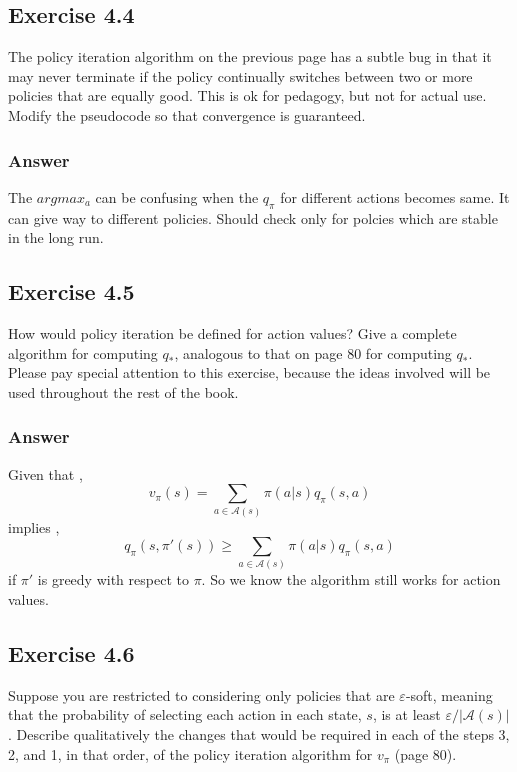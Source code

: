 \begin{Document}
\subsection{Exercise 4.4}
The policy iteration algorithm on the previous page has a subtle bug in that it may never terminate if the policy continually switches between two or more policies that are equally good. This is ok for pedagogy, but not for actual use. Modify the pseudocode so that convergence is guaranteed.

\subsubsection{Answer}
The $argmax_a$ can be confusing when the $q_\pi$ for different actions becomes same. It can give way to different policies. Should check only for polcies which are stable in the long run.

\subsection{Exercise 4.5}
How would policy iteration be defined for action values? Give a complete algorithm for computing $q_*$, analogous to that on page 80 for computing $q_*$. Please pay special attention to this exercise, because the ideas involved will be used throughout the rest of the book.

\subsubsection{Answer}
Given that ,
\begin{equation}
    v_\pi(s) = \sum_{a \in \mathcal{A}(s)} \pi(a|s)q_\pi(s, a)
\end{equation}
implies ,
\begin{equation}
    q_\pi(s, \pi'(s)) \geq \sum_{a \in \mathcal{A}(s)} \pi(a|s)q_\pi(s, a)
\end{equation}
if $\pi'$ is greedy with respect to $\pi$. So we know the algorithm still works for action values.

\subsection{Exercise 4.6}
Suppose you are restricted to considering only policies that are $\varepsilon$-soft, meaning that the probability of selecting each action in each state, $s$, is at least $\varepsilon / |\mathcal{A}(s)|$. Describe qualitatively the changes that would be required in each of the steps 3, 2, and 1, in that order, of the policy iteration algorithm for $v_\pi$ (page 80).



\end{Document}
